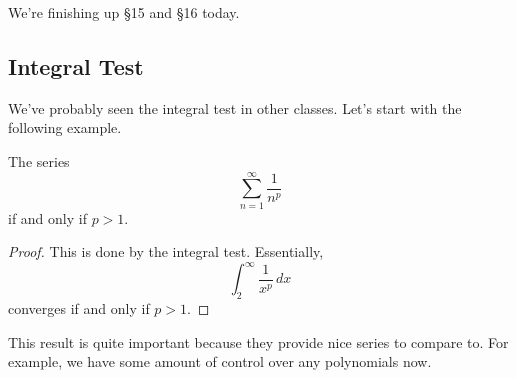 














We're finishing up \S15 and \S16 today.

\subsection{Integral Test}
We've probably seen the integral test in other classes. Let's start with the following example.
\begin{prop}
	The series
	\[\sum_{n=1}^\infty\frac1{n^p}\]
	if and only if $p>1.$
\end{prop}
\begin{proof}
	This is done by the integral test. Essentially,
	\[\int_2^\infty\frac1{x^p}\,dx\]
	converges if and only if $p>1.$
\end{proof}
\begin{remark}
	This result is quite important because they provide nice series to compare to. For example, we have some amount of control over any polynomials now.
\end{remark}

